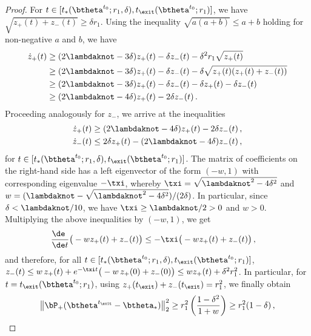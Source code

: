\documentclass[11pt]{article}
\begin{document}
\begin{proof}
For $t\in [t_*(\btheta^{t_0};r_1,\delta),t_{\exit}(\btheta^{t_0};r_1)]$, we have $\sqrt{z_+(t)+z_-(t)}\ge \delta r_1$. Using the inequality $\sqrt{a(a+b)}\le a+b$ holding for non-negative $a$ and $b$, we have
%
\begin{align}
%
\dot{z}_+(t)&\ge (2\lambdaknot-3\delta) z_+(t) -\delta z_-(t) -\delta^2 r_1\sqrt{z_+(t)}\\
& \ge (2\lambdaknot-3\delta) z_+(t) -\delta z_-(t) -\delta\sqrt{z_+(t) (z_+(t) +z_-(t))}\\
&\ge  (2\lambdaknot-3\delta) z_+(t) -\delta z_-(t)-\delta z_+(t) -\delta z_-(t)\\
&\ge  (2\lambdaknot-4\delta) z_+(t) -2\delta z_-(t)\, .
%
\end{align}
%
Proceeding analogously for $z_-$, we arrive at the inequalities
\begin{align}
%
\dot{z}_+(t)&\ge (2\lambdaknot-4\delta) z_+(t) -2\delta z_-(t) \, ,\\
\dot{z}_-(t)&\le 2\delta z_+(t) -(2\lambdaknot-4\delta) z_-(t) \,,  
%
\end{align}
for $t\in [t_*(\btheta^{t_0};r_1,\delta),t_{\exit}(\btheta^{t_0};r_1)]$. The matrix of coefficients on the right-hand side has a left eigenvector of the form $(-w,1)$ with corresponding eigenvalue $-\txi$,
whereby $\txi = \sqrt{\lambdaknot^2-4\delta^2}$ and $w = (\lambdaknot-\sqrt{\lambdaknot^2-4\delta^2})/(2\delta)$. In particular,
since $\delta < \lambdaknot/10$, we have $\txi \ge \lambdaknot/2 >0$ and $w >0$.
Multiplying the above inequalities by $(-w,1)$, we get
%
\begin{align}
%
\frac{\de\phantom{t}}{\de t}\big(-w z_+(t)+z_-(t)\big)&\le -\txi \big(-w z_+(t)+z_-(t)\big)\, ,
%
\end{align}
%
and therefore, for all $t\in[t_*(\btheta^{t_0};r_1,\delta),t_{\exit}(\btheta^{t_0};r_1)]$,
$z_-(t)\le w\, z_+(t) +e^{-\txi t}\big(-w\, z_+(0)+z_-(0)\big)\le wz_+(t)+\delta^2r_1^2$.
In particular, for $t=t_{\exit}(\btheta^{t_0};r_1)$, using $z_+(t_{\exit})+z_-(t_{\exit}) =r_1^2$, we finally obtain 
%
\begin{align}
%
\big\|\bP_+(\btheta^{t_{\exit}}-\btheta_*)\big\|_2^2&\ge r_1^2\left(\frac{1-\delta^2}{1+w}\right) \ge r_1^2(1- \delta)\, ,\\

\end{align}
\end{proof}
\end{document}
